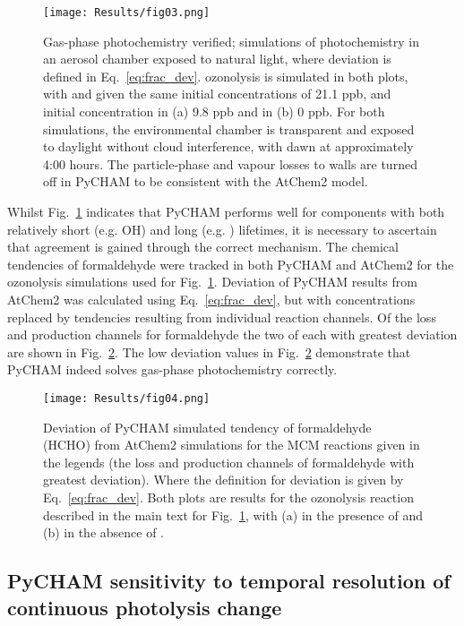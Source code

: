 \documentclass[gmd, manuscript]{copernicus}
\begin{document}
\begin{figure}[t]
\texttt{[image: Results/fig03.png]}
\caption{Gas-phase photochemistry verified; simulations of photochemistry in an aerosol chamber exposed to natural light, where deviation is defined in Eq.~\ref{eq:frac_dev}.   ozonolysis is simulated in both plots, with  and  given the same initial concentrations of 21.1 \unit{ppb}, and initial  concentration in (a) 9.8 \unit{ppb} and in (b) 0 \unit{ppb}.  For both simulations, the environmental chamber is transparent and exposed to daylight without cloud interference, with dawn at approximately 4:00 hours.  The particle-phase and vapour losses to walls are turned off in PyCHAM to be consistent with the AtChem2 model.}
\label{fig:GasChemVer1}
\end{figure}

Whilst Fig.~\ref{fig:GasChemVer1} indicates that PyCHAM performs well for components with both relatively short (e.g. OH) and long (e.g. ) lifetimes, it is necessary to ascertain that agreement is gained through the correct mechanism.  The chemical tendencies of formaldehyde were tracked in both PyCHAM and AtChem2 for the  ozonolysis simulations used for Fig.~\ref{fig:GasChemVer1}.  Deviation of PyCHAM results from AtChem2 was calculated using Eq.~\ref{eq:frac_dev}, but with concentrations replaced by tendencies resulting from individual reaction channels.  Of the loss and production channels for formaldehyde the two of each with greatest deviation are shown in Fig.~\ref{fig:GasChemVer2}.  The low deviation values in Fig.~\ref{fig:GasChemVer2} demonstrate that PyCHAM indeed solves gas-phase photochemistry correctly.

\begin{figure}[t]
\texttt{[image: Results/fig04.png]}
\caption{Deviation of PyCHAM simulated tendency of formaldehyde (HCHO) from AtChem2 simulations for the MCM reactions given in the legends (the loss and production channels of formaldehyde with greatest deviation).  Where the definition for deviation is given by Eq.~\ref{eq:frac_dev}.  Both plots are results for the  ozonolysis reaction described in the main text for Fig.~\ref{fig:GasChemVer1}, with (a) in the presence of  and (b) in the absence of .}
\label{fig:GasChemVer2}
\end{figure}


\subsection{PyCHAM sensitivity to temporal resolution of continuous photolysis change}
\end{document}
